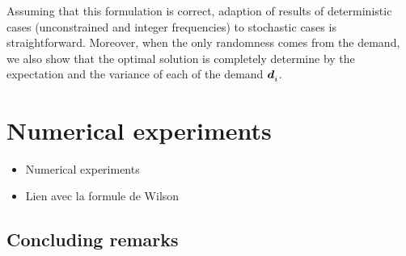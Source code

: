 

Assuming that this formulation is correct, adaption of results of deterministic cases (unconstrained and integer frequencies) to stochastic cases is straightforward.
Moreover, when the only randomness comes from the demand, we also show that the optimal solution is completely determine by the expectation and the variance of each of the demand $\va\demand_i$.





\section{Numerical experiments}

\begin{itemize}
  \item Numerical experiments
  \item Lien avec la formule de Wilson
\end{itemize}


\subsection{Concluding remarks}




